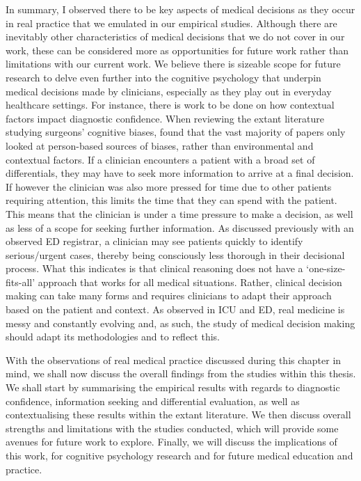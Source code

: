 \documentclass[a4paper, nobind]{templates/ociamthesis}
\begin{document}
\hfill\break
In summary, I observed there to be key aspects of medical decisions as they occur in real practice that we emulated in our empirical studies. Although there are inevitably other characteristics of medical decisions that we do not cover in our work, these can be considered more as opportunities for future work rather than limitations with our current work. We believe there is sizeable scope for future research to delve even further into the cognitive psychology that underpin medical decisions made by clinicians, especially as they play out in everyday healthcare settings. For instance, there is work to be done on how contextual factors impact diagnostic confidence. When reviewing the extant literature studying surgeons' cognitive biases, \autocite{armstrong_cognitive_2023} found that the vast majority of papers only looked at person-based sources of biases, rather than environmental and contextual factors. If a clinician encounters a patient with a broad set of differentials, they may have to seek more information to arrive at a final decision. If however the clinician was also more pressed for time due to other patients requiring attention, this limits the time that they can spend with the patient. This means that the clinician is under a time pressure to make a decision, as well as less of a scope for seeking further information. As discussed previously with an observed ED registrar, a clinician may see patients quickly to identify serious/urgent cases, thereby being consciously less thorough in their decisional process. What this indicates is that clinical reasoning does not have a `one-size-fits-all' approach that works for all medical situations. Rather, clinical decision making can take many forms and requires clinicians to adapt their approach based on the patient and context. As observed in ICU and ED, real medicine is messy and constantly evolving and, as such, the study of medical decision making should adapt its methodologies and to reflect this.

\hfill\break
With the observations of real medical practice discussed during this chapter in mind, we shall now discuss the overall findings from the studies within this thesis. We shall start by summarising the empirical results with regards to diagnostic confidence, information seeking and differential evaluation, as well as contextualising these results within the extant literature. We then discuss overall strengths and limitations with the studies conducted, which will provide some avenues for future work to explore. Finally, we will discuss the implications of this work, for cognitive psychology research and for future medical education and practice.
\end{document}
